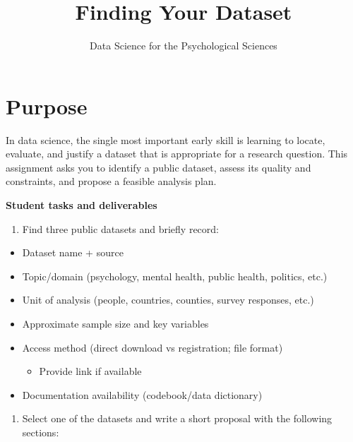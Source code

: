 \documentclass[
  11pt,
]{article}
\title{Finding Your Dataset}
\author{Data Science for the Psychological Sciences}
\date{}
\providecommand{\tightlist}{%
  \setlength{\itemsep}{0pt}\setlength{\parskip}{0pt}}
\begin{document}
\maketitle

\section{Purpose}\label{purpose}

In data science, the single most important early skill is learning to
locate, evaluate, and justify a dataset that is appropriate for a
research question. This assignment asks you to identify a public
dataset, assess its quality and constraints, and propose a feasible
analysis plan.

\textbf{Student tasks and deliverables}

\begin{enumerate}
\def\labelenumi{\arabic{enumi}.}
\tightlist
\item
  Find three public datasets and briefly record:
\end{enumerate}

\begin{itemize}
\tightlist
\item
  Dataset name + source
\item
  Topic/domain (psychology, mental health, public health, politics,
  etc.)
\item
  Unit of analysis (people, countries, counties, survey responses, etc.)
\item
  Approximate sample size and key variables
\item
  Access method (direct download vs registration; file format)

  \begin{itemize}
  \tightlist
  \item
    Provide link if available
  \end{itemize}
\item
  Documentation availability (codebook/data dictionary)
\end{itemize}

\begin{enumerate}
\def\labelenumi{\arabic{enumi}.}
\setcounter{enumi}{1}
\tightlist
\item
  Select one of the datasets and write a short proposal with the
  following sections:
\end{enumerate}
\end{document}
